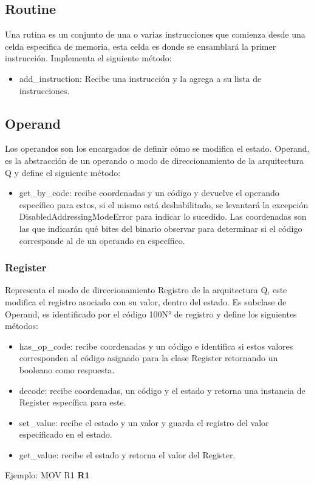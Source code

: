 \subsection{Routine}
Una rutina es un conjunto de una o varias instrucciones que comienza desde una celda especifica de memoria, esta celda es donde se ensamblará la primer instrucción.  
Implementa el siguiente método:

\begin{itemize}
	\item add\_instruction: Recibe una instrucción y la agrega a su lista de instrucciones.
\end{itemize}
 
\subsection{Operand}
Los operandos son los encargados de definir cómo se modifica el estado.
Operand, es la abstracción de un operando o modo de direccionamiento de la arquitectura Q y define el siguiente método:
 
\begin{itemize}
    \item get\_by\_code: recibe coordenadas y un código y devuelve el operando específico para estos, si el mismo está deshabilitado, se levantará la excepción DisabledAddressingModeError para indicar lo sucedido. Las coordenadas son las que indicarán qué bites del binario observar para determinar si el código corresponde al de un operando en específico. 
\end{itemize}
 
\subsubsection{Register}
Representa el modo de direccionamiento Registro de la arquitectura Q, este modifica el registro asociado con su valor, dentro del estado. 
Es subclase de Operand, es identificado por el código 100{N° de registro} y define los siguientes métodos:
 
\begin{itemize}
    \item has\_op\_code: recibe coordenadas y un código e identifica si estos valores corresponden al código asignado para la clase Register retornando un booleano como respuesta.
    \item decode: recibe coordenadas, un código y el estado y retorna una instancia de Register específica para este.
    \item set\_value: recibe el estado y un valor y guarda el registro del valor especificado en el estado.
    \item get\_value: recibe el estado y retorna el valor del Register.
\end{itemize}
Ejemplo: MOV R1 \textbf{R1}
 
